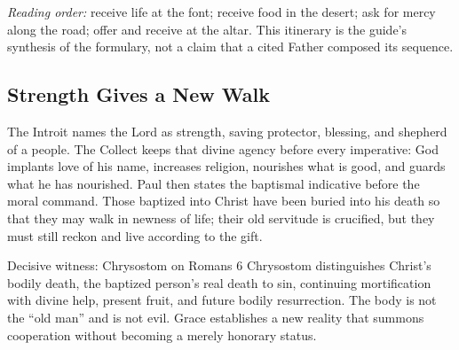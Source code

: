 \begin{deepstudy}
\begin{center}
\end{center}

\noindent\emph{Reading order:} receive life at the font; receive food in the desert; ask for mercy along the road; offer and receive at the altar. This itinerary is the guide's synthesis of the formulary, not a claim that a cited Father composed its sequence.

\sectionguard
\subsection*{Strength Gives a New Walk\enspace{}}

The Introit names the Lord as strength, saving protector, blessing, and shepherd of a people. The Collect keeps that divine agency before every imperative: God implants love of his name, increases religion, nourishes what is good, and guards what he has nourished. Paul then states the baptismal indicative before the moral command. Those baptized into Christ have been buried into his death so that they may walk in newness of life; their old servitude is crucified, but they must still reckon and live according to the gift.

\begin{studybox}{Decisive witness: Chrysostom on Romans 6}
Chrysostom distinguishes Christ's bodily death, the baptized person's real death to sin, continuing mortification with divine help, present fruit, and future bodily resurrection. The body is not the ``old man'' and is not evil. Grace establishes a new reality that summons cooperation without becoming a merely honorary status.
\end{studybox}


\end{deepstudy}
